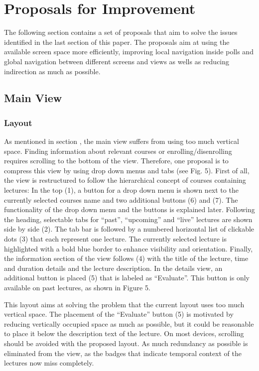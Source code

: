 \section{Proposals for Improvement}

The following section contains a set of proposals that aim to solve the issues identified in the last section of this paper. The proposals aim at using the available screen space more efficiently, improving local navigation inside polls and global navigation between different screens and views as wells as reducing indirection as much as possible.

\subsection{Main View}

\subsubsection{Layout}
As mentioned in section \todosct, the main view suffers from using too much vertical space. Finding information about relevant courses or enrolling/disenrolling requires scrolling to the bottom of the view. Therefore, one proposal is to compress this view by using drop down menus and tabs (see Fig. 5). First of all, the view is restructured to follow the hierarchical concept of courses containing lectures: In the top (1), a button for a drop down menu is shown next to the currently selected courses name and two additional buttons (6) and (7). The functionality of the drop down menu and the buttons is explained later.
Following the heading, selectable tabs for “past”, “upcoming” and “live” lectures are shown side by side (2). The tab bar is followed by a numbered horizontal list of clickable dots (3) that each represent one lecture. The currently selected lecture is highlighted with a bold blue border to enhance visibility and orientation. Finally, the information section of the view follows (4) with the title of the lecture, time and duration details and the lecture description. In the details view, an additional button is placed (5) that is labeled as “Evaluate”. This button is only available on past lectures, as shown in Figure 5.

This layout aims at solving the problem that the current layout uses too much vertical space. The placement of the “Evaluate” button (5) is motivated by reducing vertically occupied space as much as possible, but it could be reasonable to place it below the description text of the lecture.  On most devices, scrolling should be avoided with the proposed layout. As much redundancy as possible is eliminated from the view, as the badges that indicate temporal context of the lectures now miss completely.

